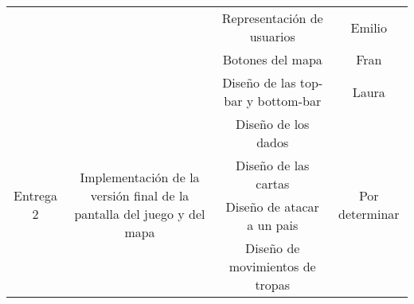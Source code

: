 \documentclass[11pt, a4paper, titlepage]{article}
\begin{document}
\begin{landscape}
\begin{table}[hbt!]
\begin{tabular}{c|ccll|cc|}
\multicolumn{1}{|c|}{}                            & \multicolumn{1}{c|}{}                                                                                           & \multicolumn{3}{c|}{Representación de usuarios}                                                                & \multicolumn{2}{c|}{Emilio}                                                  \\ \cline{3-7}
\multicolumn{1}{|c|}{}                            & \multicolumn{1}{c|}{}                                                                                           & \multicolumn{3}{c|}{Botones del mapa}                                                                          & \multicolumn{2}{c|}{Fran}                                                    \\ \cline{3-7}
\multicolumn{1}{|c|}{}                            & \multicolumn{1}{c|}{}                                                                                           & \multicolumn{3}{c|}{Diseño de las top-bar y bottom-bar}                                                        & \multicolumn{2}{c|}{Laura}                                                   \\ \hline
\multicolumn{1}{|c|}{\multirow{22}{*}{Entrega 2}} & \multicolumn{1}{c|}{\multirow{8}{*}{Implementación de la versión final de la pantalla del juego y del mapa}}    & \multicolumn{3}{c|}{Diseño de los dados}                                                                       & \multicolumn{2}{c|}{\multirow{22}{*}{Por determinar}}                        \\ \cline{3-5}
\multicolumn{1}{|c|}{}                            & \multicolumn{1}{c|}{}                                                                                           & \multicolumn{3}{c|}{Diseño de las cartas}                                                                      & \multicolumn{2}{c|}{}                                                        \\ \cline{3-5}
\multicolumn{1}{|c|}{}                            & \multicolumn{1}{c|}{}                                                                                           & \multicolumn{3}{c|}{Diseño de atacar a un pais}                                                                & \multicolumn{2}{c|}{}                                                        \\ \cline{3-5}
\multicolumn{1}{|c|}{}                            & \multicolumn{1}{c|}{}                                                                                           & \multicolumn{3}{c|}{Diseño de movimientos de tropas}                                                           & \multicolumn{2}{c|}{}                                                        \\ \cline{3-5}

\end{tabular}
\end{table}
\end{landscape}
\end{document}
